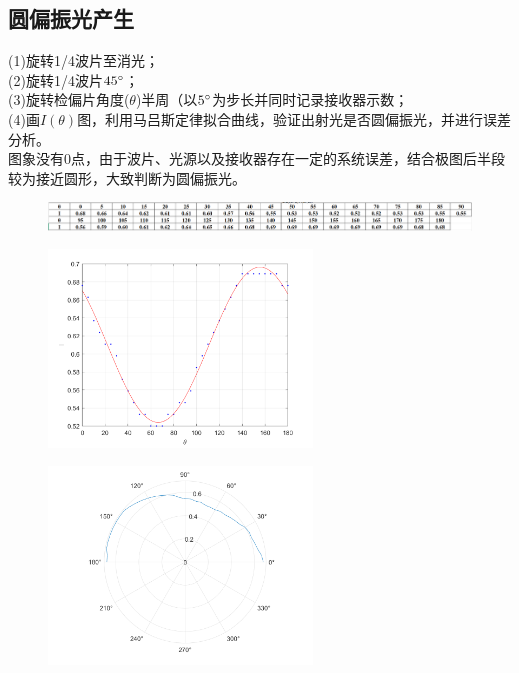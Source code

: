 \documentclass{article}
\begin{document}
\subsection{圆偏振光产生}
(1)旋转1/4波片至消光；\\
(2)旋转1/4波片$45\degree$；\\
(3)旋转检偏片角度(\(\theta\))半周（以$5\degree$为步长并同时记录接收器示数；\\
(4)画\(I(\theta)\)图，利用马吕斯定律拟合曲线，验证出射光是否圆偏振光，并进行误差分析。\\
\hspace*{2em}图象没有0点，由于波片、光源以及接收器存在一定的系统误差，结合极图后半段较为接近圆形，大致判断为圆偏振光。
\begin{figure}[ht]
    \centering
    \includegraphics[width=12cm]{5.4.png}
\end{figure}
\begin{figure}[!h]
    \centering
    \includegraphics[width=7cm]{4.png}
\end{figure}
\begin{figure}[!h]
    \centering
    \includegraphics[width=7cm]{44.png}
\end{figure}
\end{document}
